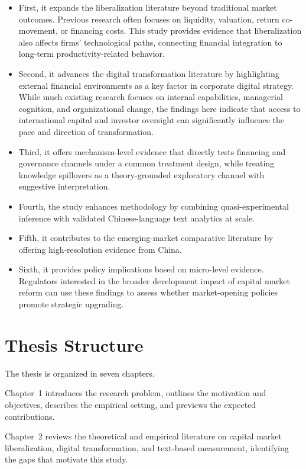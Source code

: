 \begin{itemize}
    \item First, it expands the liberalization literature beyond traditional market outcomes. Previous research often focuses on liquidity, valuation, return co-movement, or financing costs. This study provides evidence that liberalization also affects firms' technological paths, connecting financial integration to long-term productivity-related behavior.
    \item Second, it advances the digital transformation literature by highlighting external financial environments as a key factor in corporate digital strategy. While much existing research focuses on internal capabilities, managerial cognition, and organizational change, the findings here indicate that access to international capital and investor oversight can significantly influence the pace and direction of transformation.
    \item Third, it offers mechanism-level evidence that directly tests financing and governance channels under a common treatment design, while treating knowledge spillovers as a theory-grounded exploratory channel with suggestive interpretation.
    \item Fourth, the study enhances methodology by combining quasi-experimental inference with validated Chinese-language text analytics at scale.
    \item Fifth, it contributes to the emerging-market comparative literature by offering high-resolution evidence from China.
    \item Sixth, it provides policy implications based on micro-level evidence. Regulators interested in the broader development impact of capital market reform can use these findings to assess whether market-opening policies promote strategic upgrading.
\end{itemize}

\section{Thesis Structure}

The thesis is organized in seven chapters.

Chapter~1 introduces the research problem, outlines the motivation and objectives, describes the empirical setting, and previews the expected contributions.

Chapter~2 reviews the theoretical and empirical literature on capital market liberalization, digital transformation, and text-based measurement, identifying the gaps that motivate this study.

